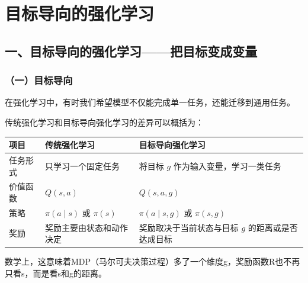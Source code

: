\setcounter{section}{4}

\hypertarget{ux76eeux6807ux5bfcux5411ux7684ux5f3aux5316ux5b66ux4e60}{%
\section{目标导向的强化学习}\label{ux76eeux6807ux5bfcux5411ux7684ux5f3aux5316ux5b66ux4e60}}

\hypertarget{ux4e00ux76eeux6807ux5bfcux5411ux7684ux5f3aux5316ux5b66ux4e60ux628aux76eeux6807ux53d8ux6210ux53d8ux91cf}{%
\subsection{一、目标导向的强化学习------把目标变成变量}\label{ux4e00ux76eeux6807ux5bfcux5411ux7684ux5f3aux5316ux5b66ux4e60ux628aux76eeux6807ux53d8ux6210ux53d8ux91cf}}

\hypertarget{ux4e00ux76eeux6807ux5bfcux5411}{%
\subsubsection{（一）目标导向}\label{ux4e00ux76eeux6807ux5bfcux5411}}

在强化学习中，有时我们希望模型不仅能完成单一任务，还能迁移到通用任务。

传统强化学习和目标导向强化学习的差异可以概括为：

\begin{longtable}[]{@{}
  >{\raggedright\arraybackslash}p{}
  >{\raggedright\arraybackslash}p{}
  >{\raggedright\arraybackslash}p{}@{}}
\toprule
项目 & 传统强化学习 & 目标导向强化学习 \\
\midrule
\endhead
任务形式 & 只学习一个固定任务 & 将目标 \(g\) 作为输入变量，学习一类任务 \\
价值函数 & \(Q(s,a)\) & \(Q(s,a,g)\) \\
策略 & \(\pi(a\mid s)\) 或 \(\pi(s)\) & \(\pi(a\mid s,g)\) 或 \(\pi(s,g)\) \\
奖励 & 奖励主要由状态和动作决定 & 奖励取决于当前状态与目标 \(g\) 的距离或是否达成目标 \\
\bottomrule
\end{longtable}

数学上，这意味着MDP（马尔可夫决策过程）多了一个维度g，奖励函数R也不再只看s，而是看s和g的距离。

